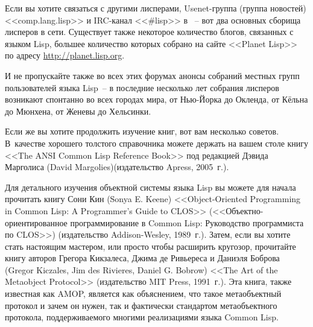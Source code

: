 Если вы хотите связаться с другими лисперами, Usenet-группа (группа новостей)
<<comp.lang.lisp>> и IRC-канал <<\#lisp>> в ~-- вот два основных сборища лисперов в сети. Существует также некоторое количество блогов, связанных с языком Lisp, большее
количество которых собрано на сайте <<Planet Lisp>> по адресу
\mbox{\url{http://planet.lisp.org}}.

И не пропускайте также во всех этих форумах анонсы собраний местных групп пользователей
языка Lisp~-- в последние несколько лет собрания лисперов возникают спонтанно во всех
городах мира, от Нью-Йорка до Окленда, от Кёльна до Мюнхена, от Женевы до Хельсинки.

Если же вы хотите продолжить изучение книг, вот вам несколько советов. В~качестве хорошего
толстого справочника можете держать на вашем столе книгу <<The ANSI Common Lisp Reference
Book>> под редакцией Дэвида Марголиса (David Margolies)(издательство Apress,
2005~г.).

Для детального изучения объектной системы языка Lisp вы можете для начала прочитать книгу
Сони Кин (Sonya E. Keene) <<Object-Oriented Programming in Common Lisp: A Programmer's
Guide to CLOS>> (<<Объектно-ориентированное программирование в Common Lisp: Руководство
программиста по CLOS>>) (издательство Addison-Wesley, 1989~г.). Затем, если вы хотите
стать настоящим мастером, или просто чтобы расширить кругозор, прочитайте книгу авторов
Грегора Кикзалеса, Джима де Ривьереса и Даниэля Боброва (Gregor Kiczales, Jim des
Rivieres, Daniel G. Bobrow) <<The Art of the Metaobject Protocol>> (издательство MIT
Press, 1991~г.). Эта книга, также известная как AMOP, является как объяснением, что такое
метаобъектный протокол и зачем он нужен, так и фактически стандартом метаобъектного
протокола, поддерживаемого многими реализациями языка Common Lisp.

